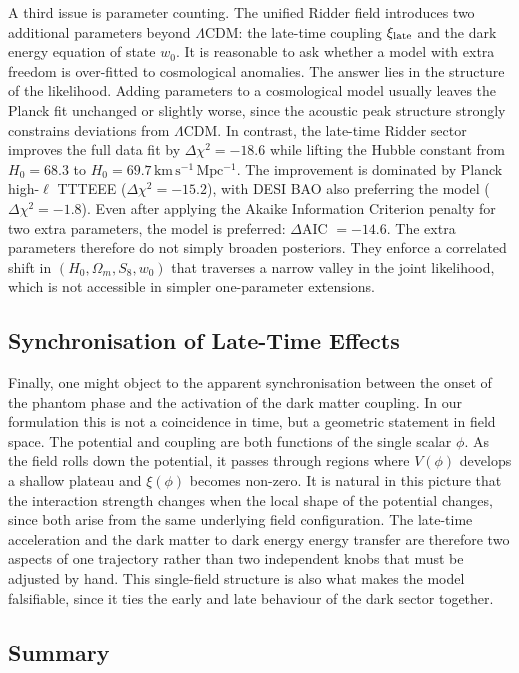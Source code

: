 \documentclass[twocolumn,showpacs,preprintnumbers,amsmath,amssymb,prd]{revtex4-2}
\begin{document}
A third issue is parameter counting. The unified Ridder field introduces two additional parameters beyond $\Lambda$CDM: the late-time coupling $\xi_{\rm late}$ and the dark energy equation of state $w_0$. It is reasonable to ask whether a model with extra freedom is over-fitted to cosmological anomalies. The answer lies in the structure of the likelihood. Adding parameters to a cosmological model usually leaves the Planck fit unchanged or slightly worse, since the acoustic peak structure strongly constrains deviations from $\Lambda$CDM. In contrast, the late-time Ridder sector improves the full data fit by $\Delta\chi^2 = -18.6$ while lifting the Hubble constant from $H_0 = 68.3$ to $H_0 = 69.7\,\mathrm{km\,s^{-1}\,Mpc^{-1}}$. The improvement is dominated by Planck high-$\ell$ TTTEEE ($\Delta\chi^2 = -15.2$), with DESI BAO also preferring the model ($\Delta\chi^2 = -1.8$). Even after applying the Akaike Information Criterion penalty for two extra parameters, the model is preferred: $\Delta$AIC $= -14.6$. The extra parameters therefore do not simply broaden posteriors. They enforce a correlated shift in $(H_0, \Omega_m, S_8, w_0)$ that traverses a narrow valley in the joint likelihood, which is not accessible in simpler one-parameter extensions.

\subsection{Synchronisation of Late-Time Effects}

Finally, one might object to the apparent synchronisation between the onset of the phantom phase and the activation of the dark matter coupling. In our formulation this is not a coincidence in time, but a geometric statement in field space. The potential and coupling are both functions of the single scalar $\phi$. As the field rolls down the potential, it passes through regions where $V(\phi)$ develops a shallow plateau and $\xi(\phi)$ becomes non-zero. It is natural in this picture that the interaction strength changes when the local shape of the potential changes, since both arise from the same underlying field configuration. The late-time acceleration and the dark matter to dark energy energy transfer are therefore two aspects of one trajectory rather than two independent knobs that must be adjusted by hand. This single-field structure is also what makes the model falsifiable, since it ties the early and late behaviour of the dark sector together.

\subsection{Summary}
\end{document}
